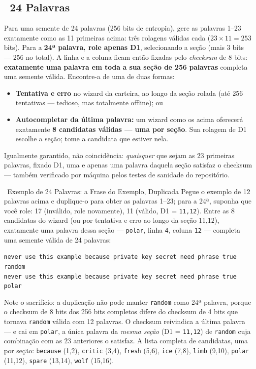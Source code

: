 \documentclass[10pt]{article}
\begin{document}
\subsection*{\faLayerGroup~24 Palavras}

Para uma semente de 24 palavras (256 bits de entropia), gere as palavras 1--23 exatamente como as 11 primeiras acima: três rolagens válidas cada ($23\times11=253$ bits). Para a \textbf{24ª palavra, role apenas D1}, selecionando a seção (mais 3 bits --- 256 no total). A linha e a coluna ficam então fixadas pelo \textit{checksum} de 8 bits: \textbf{exatamente uma palavra em toda a sua seção de 256 palavras} completa uma semente válida. Encontre-a de uma de duas formas:

\begin{itemize}[itemsep=1pt]
 \item \textbf{Tentativa e erro} no wizard da carteira, ao longo da seção rolada (até 256 tentativas --- tedioso, mas totalmente offline); ou
 \item \textbf{Autocompletar da última palavra:} um wizard como os acima oferecerá exatamente \textbf{8 candidatas válidas --- uma por seção}. Sua rolagem de D1 escolhe a seção; tome a candidata que estiver nela.
\end{itemize}

Igualmente garantido, não coincidência: \emph{quaisquer} que sejam as 23 primeiras palavras, fixado D1, uma e apenas uma palavra daquela seção satisfaz o checksum --- também verificado por máquina pelos testes de sanidade do repositório.

\begin{examplebox}{\faLightbulb~Exemplo de 24 Palavras: a Frase do Exemplo, Duplicada}
Pegue o exemplo de 12 palavras acima e duplique-o para obter as palavras 1--23; para a 24ª, suponha que você role: 17 (inválido, role novamente), 11 (válido, D1 = \texttt{11,12}). Entre as 8 candidatas do wizard (ou por tentativa e erro ao longo da seção 11,12), exatamente uma palavra dessa seção --- \texttt{polar}, linha \texttt{4}, coluna \texttt{12} --- completa uma semente válida de 24 palavras:

\vspace{0.5em}
\texttt{never use this example because private key secret need phrase true random}\\
\texttt{never use this example because private key secret need phrase true polar}~\faCheckCircle
\vspace{0.5em}

Note o sacrifício: a duplicação não pode manter \texttt{random} como 24ª palavra, porque o checksum de 8 bits dos 256 bits completos difere do checksum de 4 bits que tornava \texttt{random} válida com 12 palavras. O checksum reivindica a última palavra --- e cai em \texttt{polar}, a única palavra da \emph{mesma seção} (D1 = \texttt{11,12}) de \texttt{random} cuja combinação com as 23 anteriores o satisfaz. A lista completa de candidatas, uma por seção: \texttt{because} (1,2), \texttt{critic} (3,4), \texttt{fresh} (5,6), \texttt{ice} (7,8), \texttt{limb} (9,10), \texttt{polar} (11,12), \texttt{spare} (13,14), \texttt{wolf} (15,16).
\end{examplebox}
\end{document}
